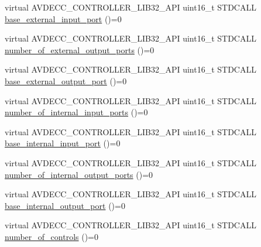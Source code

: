 \begin{DoxyCompactItemize}
\item 
virtual A\+V\+D\+E\+C\+C\+\_\+\+C\+O\+N\+T\+R\+O\+L\+L\+E\+R\+\_\+\+L\+I\+B32\+\_\+\+A\+PI uint16\+\_\+t S\+T\+D\+C\+A\+LL \hyperlink{classavdecc__lib_1_1audio__unit__descriptor__response_a169b284aa7abd0796a001e72d5ea54aa}{base\+\_\+external\+\_\+input\+\_\+port} ()=0
\item 
virtual A\+V\+D\+E\+C\+C\+\_\+\+C\+O\+N\+T\+R\+O\+L\+L\+E\+R\+\_\+\+L\+I\+B32\+\_\+\+A\+PI uint16\+\_\+t S\+T\+D\+C\+A\+LL \hyperlink{classavdecc__lib_1_1audio__unit__descriptor__response_a28ebe15d58360e336a505fbf77212f5b}{number\+\_\+of\+\_\+external\+\_\+output\+\_\+ports} ()=0
\item 
virtual A\+V\+D\+E\+C\+C\+\_\+\+C\+O\+N\+T\+R\+O\+L\+L\+E\+R\+\_\+\+L\+I\+B32\+\_\+\+A\+PI uint16\+\_\+t S\+T\+D\+C\+A\+LL \hyperlink{classavdecc__lib_1_1audio__unit__descriptor__response_ad891b196acc566e036227d8eba7b0c61}{base\+\_\+external\+\_\+output\+\_\+port} ()=0
\item 
virtual A\+V\+D\+E\+C\+C\+\_\+\+C\+O\+N\+T\+R\+O\+L\+L\+E\+R\+\_\+\+L\+I\+B32\+\_\+\+A\+PI uint16\+\_\+t S\+T\+D\+C\+A\+LL \hyperlink{classavdecc__lib_1_1audio__unit__descriptor__response_a7c75c66807196519640618422ea4fc26}{number\+\_\+of\+\_\+internal\+\_\+input\+\_\+ports} ()=0
\item 
virtual A\+V\+D\+E\+C\+C\+\_\+\+C\+O\+N\+T\+R\+O\+L\+L\+E\+R\+\_\+\+L\+I\+B32\+\_\+\+A\+PI uint16\+\_\+t S\+T\+D\+C\+A\+LL \hyperlink{classavdecc__lib_1_1audio__unit__descriptor__response_a3b4b45f0709b6e468429412df98ea417}{base\+\_\+internal\+\_\+input\+\_\+port} ()=0
\item 
virtual A\+V\+D\+E\+C\+C\+\_\+\+C\+O\+N\+T\+R\+O\+L\+L\+E\+R\+\_\+\+L\+I\+B32\+\_\+\+A\+PI uint16\+\_\+t S\+T\+D\+C\+A\+LL \hyperlink{classavdecc__lib_1_1audio__unit__descriptor__response_a760f7784d2269dee6d62d9da382d6f09}{number\+\_\+of\+\_\+internal\+\_\+output\+\_\+ports} ()=0
\item 
virtual A\+V\+D\+E\+C\+C\+\_\+\+C\+O\+N\+T\+R\+O\+L\+L\+E\+R\+\_\+\+L\+I\+B32\+\_\+\+A\+PI uint16\+\_\+t S\+T\+D\+C\+A\+LL \hyperlink{classavdecc__lib_1_1audio__unit__descriptor__response_ae2a2d4457cc9f741e612ed2b60fb1457}{base\+\_\+internal\+\_\+output\+\_\+port} ()=0
\item 
virtual A\+V\+D\+E\+C\+C\+\_\+\+C\+O\+N\+T\+R\+O\+L\+L\+E\+R\+\_\+\+L\+I\+B32\+\_\+\+A\+PI uint16\+\_\+t S\+T\+D\+C\+A\+LL \hyperlink{classavdecc__lib_1_1audio__unit__descriptor__response_a5accf7abc7d231a0767ad5cac68b8b39}{number\+\_\+of\+\_\+controls} ()=0
\item 

\end{DoxyCompactItemize}
